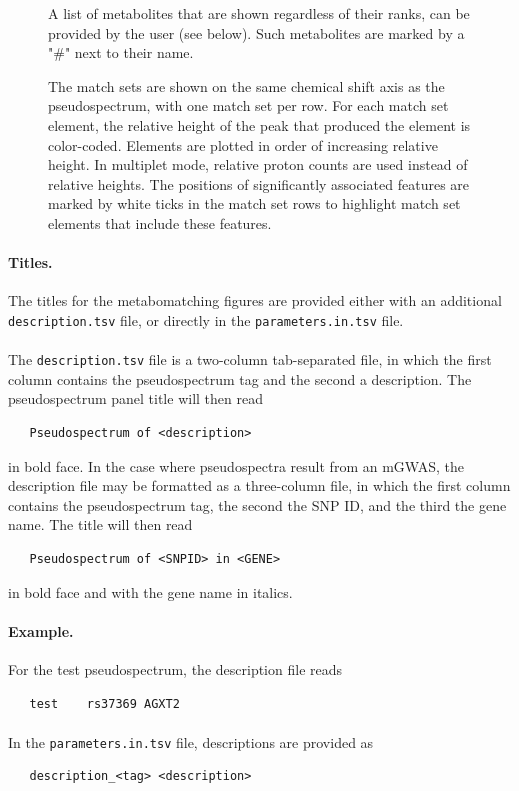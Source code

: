 \documentclass[a4paper,11pt]{article}
\begin{document}
\begin{figure}
{\begin{description}[align=left,noitemsep,labelwidth=7.2mm]
\item[F.] A list of metabolites that are shown regardless of their ranks, can be provided by the user (see below). Such metabolites are marked by a "\#" next to their name.
\item[G, H.] The match sets are shown on the same chemical shift axis as the pseudospectrum, with one match set per row. For each match set element, the relative height of the peak that produced the element is color-coded. Elements are plotted in order of increasing relative height. In multiplet mode, relative proton counts are used instead of relative heights. The positions of significantly associated features are marked by white ticks in the match set rows to highlight match set elements that include these features.
\end{description} %
}
\end{figure}
\paragraph{Titles.} The titles for the metabomatching figures are provided  either with an additional \verb|description.tsv| file, or directly in the \verb|parameters.in.tsv| file.
\paragraph{} The \verb|description.tsv| file is a two-column tab-separated file, in which the first column contains the pseudospectrum tag and the second a description. The pseudospectrum panel title will then read
\begin{verbatim}
   Pseudospectrum of <description>
\end{verbatim}
in bold face. In the case where pseudospectra result from an mGWAS, the description file may be formatted as a three-column file, in which the first column contains the pseudospectrum tag, the second the SNP ID, and the third the gene name. The title will then read
\begin{verbatim}
   Pseudospectrum of <SNPID> in <GENE>
\end{verbatim}
in bold face and with the gene name in italics.
\paragraph{Example.} For the test pseudospectrum, the description file reads
\begin{verbatim}
   test    rs37369 AGXT2
\end{verbatim}
\paragraph{} In the \verb|parameters.in.tsv| file, descriptions are provided as
\begin{verbatim}
   description_<tag> <description>
\end{verbatim}
\end{document}
